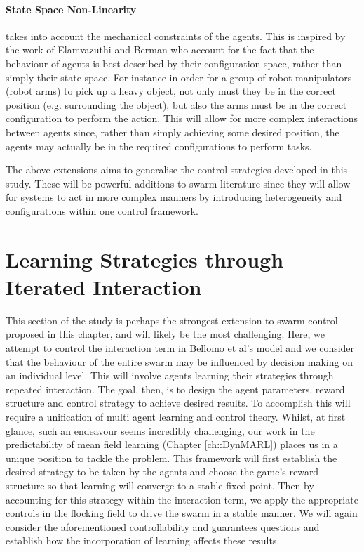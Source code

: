 \documentclass[../sample.tex]{subfiles}
\begin{document}

	\paragraph{State Space Non-Linearity} %
	\label{par:state_space_non_linearity}
	
	takes into account the mechanical constraints of the agents. This is inspired by the work of
	Elamvazuthi and Berman \cite{Elamvazuthi2018} who account for the fact that the behaviour of
	agents is best described by their configuration space, rather than simply their state space.
	For instance in order for a group of robot manipulators (robot arms) to pick up a heavy object,
	not only must they be in the correct position (e.g. surrounding the object), but also the arms
	must be in the correct configuration to perform the action. This will allow for more complex
	interactions between agents since, rather than simply achieving some desired position, the
	agents may actually be in the required configurations to perform tasks.


	The above extensions aims to generalise the control strategies developed in this study. These will be
	powerful additions to swarm literature since they will allow for systems to act in more complex
	manners by introducing heterogeneity and configurations within one control framework. 


	\section{Learning Strategies through Iterated Interaction} %
	\label{sec:learning_strategies_through_iterated_interaction}
	
	This section of the study is perhaps the strongest extension to swarm control proposed in this
	chapter, and will likely be the most challenging. Here, we attempt to control the interaction term
	in Bellomo et al's model and we consider that the behaviour of the entire swarm may be influenced
	by decision making on an individual level. This will involve agents learning their strategies
	through repeated interaction. The goal, then, is to design the agent parameters, reward structure
	and control strategy to achieve desired results. To accomplish this will require a unification of
	multi agent learning and control theory. Whilst, at first glance, such an endeavour seems
	incredibly challenging, our work in the predictability of mean field learning (Chapter 
	\ref{ch::DynMARL}) places us in a unique position to tackle the problem. This framework will
	first establish the desired strategy to be taken by the agents and choose the game's reward
	structure so that learning will converge to a stable fixed point. Then by accounting for this
	strategy within the interaction term, we apply the appropriate controls in the flocking field to
	drive the swarm in a stable manner. We will again consider the aforementioned controllability
	and guarantees questions and establish how the incorporation of learning affects these results.

\end{document}
